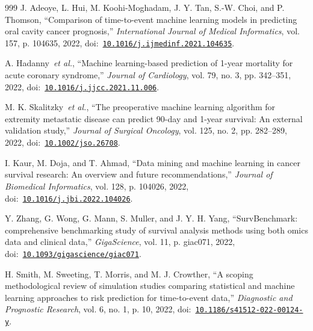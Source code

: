 \begin{thebibliography}{999}
\def\currentbiburl{https://doi.org/10.1016/j.ijmedinf.2021.104635}
 J. Adeoye, L. Hui, M. Koohi-Moghadam, J. Y. Tan, S.-W. Choi, and P. Thomson, ``Comparison of time-to-event machine learning models in predicting oral cavity cancer prognosis,'' \emph{International Journal of Medical Informatics}, vol. 157, p. 104635, 2022, doi:~\href{https://doi.org/10.1016/j.ijmedinf.2021.104635}{\nolinkurl{10.1016/j.ijmedinf.2021.104635}}.

\def\currentbiburl{https://doi.org/10.1016/j.jjcc.2021.11.006}
 A. Hadanny~\emph{et al.}, ``Machine learning-based prediction of 1-year mortality for acute coronary syndrome,'' \emph{Journal of Cardiology}, vol. 79, no. 3, pp. 342--351, 2022, doi:~\href{https://doi.org/10.1016/j.jjcc.2021.11.006}{\nolinkurl{10.1016/j.jjcc.2021.11.006}}.

\def\currentbiburl{https://doi.org/10.1002/jso.26708}
 M. K. Skalitzky~\emph{et al.}, ``The preoperative machine learning algorithm for extremity metastatic disease can predict 90-day and 1-year survival: An external validation study,'' \emph{Journal of Surgical Oncology}, vol. 125, no. 2, pp. 282--289, 2022, doi:~\href{https://doi.org/10.1002/jso.26708}{\nolinkurl{10.1002/jso.26708}}.

\def\currentbiburl{https://doi.org/10.1016/j.jbi.2022.104026}
 I. Kaur, M. Doja, and T. Ahmad, ``Data mining and machine learning in cancer survival research: An overview and future recommendations,'' \emph{Journal of Biomedical Informatics}, vol. 128, p. 104026, 2022, doi:~\href{https://doi.org/10.1016/j.jbi.2022.104026}{\nolinkurl{10.1016/j.jbi.2022.104026}}.

\def\currentbiburl{https://doi.org/10.1093/gigascience/giac071}
 Y. Zhang, G. Wong, G. Mann, S. Muller, and J. Y. H. Yang, ``SurvBenchmark: comprehensive benchmarking study of survival analysis methods using both omics data and clinical data,'' \emph{GigaScience}, vol. 11, p. giac071, 2022, doi:~\href{https://doi.org/10.1093/gigascience/giac071}{\nolinkurl{10.1093/gigascience/giac071}}.

\def\currentbiburl{https://doi.org/10.1186/s41512-022-00124-y}
 H. Smith, M. Sweeting, T. Morris, and M. J. Crowther, ``A scoping methodological review of simulation studies comparing statistical and machine learning approaches to risk prediction for time-to-event data,'' \emph{Diagnostic and Prognostic Research}, vol. 6, no. 1, p. 10, 2022, doi:~\href{https://doi.org/10.1186/s41512-022-00124-y}{\nolinkurl{10.1186/s41512-022-00124-y}}.


\end{thebibliography}
